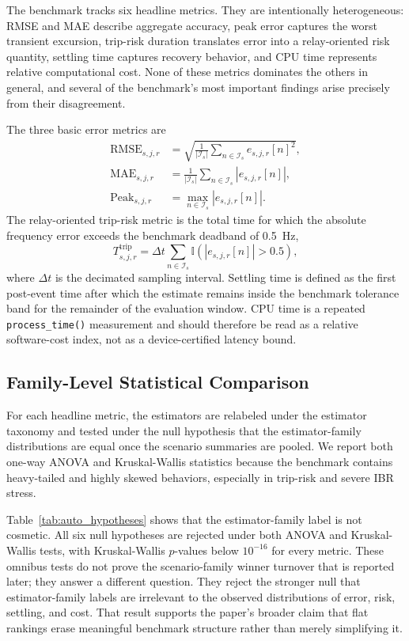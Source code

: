 The benchmark tracks six headline metrics. They are intentionally heterogeneous: RMSE and MAE describe aggregate accuracy, peak error captures the worst transient excursion, trip-risk duration translates error into a relay-oriented risk quantity, settling time captures recovery behavior, and CPU time represents relative computational cost. None of these metrics dominates the others in general, and several of the benchmark's most important findings arise precisely from their disagreement.

The three basic error metrics are
\begin{align}
\mathrm{RMSE}_{s,j,r} &= \sqrt{\frac{1}{|\mathcal{I}_s|} \sum_{n \in \mathcal{I}_s} e_{s,j,r}[n]^2}, \label{eq:rmse} \\
\mathrm{MAE}_{s,j,r} &= \frac{1}{|\mathcal{I}_s|} \sum_{n \in \mathcal{I}_s} |e_{s,j,r}[n]|, \label{eq:mae} \\
\mathrm{Peak}_{s,j,r} &= \max_{n \in \mathcal{I}_s} |e_{s,j,r}[n]|. \label{eq:peak}
\end{align}
The relay-oriented trip-risk metric is the total time for which the absolute frequency error exceeds the benchmark deadband of \SI{0.5}{Hz},
\begin{equation}
T^{\mathrm{trip}}_{s,j,r} = \Delta t \sum_{n \in \mathcal{I}_s} \mathbb{I}\!\left(|e_{s,j,r}[n]| > 0.5\right),
\label{eq:trip_risk}
\end{equation}
where $\Delta t$ is the decimated sampling interval. Settling time is defined as the first post-event time after which the estimate remains inside the benchmark tolerance band for the remainder of the evaluation window. CPU time is a repeated \texttt{process\_time()} measurement and should therefore be read as a relative software-cost index, not as a device-certified latency bound.



\subsection{Family-Level Statistical Comparison}

For each headline metric, the estimators are relabeled under the estimator taxonomy and tested under the null hypothesis that the estimator-family distributions are equal once the scenario summaries are pooled. We report both one-way ANOVA and Kruskal-Wallis statistics because the benchmark contains heavy-tailed and highly skewed behaviors, especially in trip-risk and severe IBR stress.



Table~\ref{tab:auto_hypotheses} shows that the estimator-family label is not cosmetic. All six null hypotheses are rejected under both ANOVA and Kruskal-Wallis tests, with Kruskal-Wallis $p$-values below $10^{-16}$ for every metric. These omnibus tests do not prove the scenario-family winner turnover that is reported later; they answer a different question. They reject the stronger null that estimator-family labels are irrelevant to the observed distributions of error, risk, settling, and cost. That result supports the paper's broader claim that flat rankings erase meaningful benchmark structure rather than merely simplifying it.
